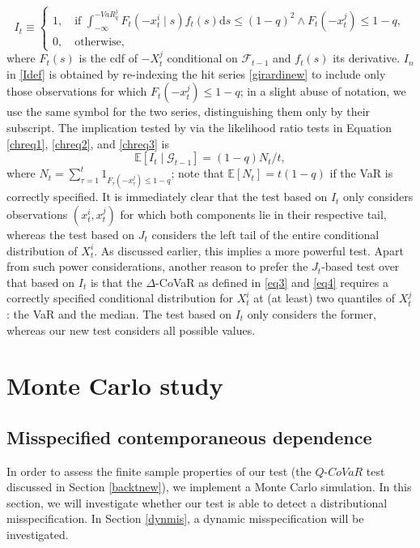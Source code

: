 \documentclass[12pt]{article}
\begin{document}
\begin{equation}\label{girardinew}
I_t\equiv \begin{cases}1,\quad \mbox{if } \int_{-\infty}^{-VaR^j_q}F_t (-x^{i}_t\mid s)f_t(s)\mathrm{d}s\leq (1-q)^2 \wedge F_t (-x^{j}_t) \leq 1-q,\\0,\quad \mbox{otherwise,}\end{cases}
\end{equation}
where $F_t (s)$ is the cdf of $-X_t^j$ conditional on $\mathcal{F}_{t-1}$ and $f_t(s)$ its derivative. $I_n$ in \eqref{Idef} is obtained by re-indexing the hit series \eqref{girardinew} to include only those observations for which $ F_t (-x^{j}_t) \leq 1-q$; in a slight abuse of notation, we use the same symbol for the two series, distinguishing them only by their subscript.  The implication tested by \citet{girardi} via the likelihood ratio tests in Equation \ref{chreq1}, \ref{chreq2}, and \ref{chreq3} is
\[
\mathbb{E}[I_t\mid \mathcal{G}_{t-1}]=(1-q)N_t/t,
\]
where $N_t=\sum_{\tau=1}^t 1_{F_\tau (-x^{j}_\tau) \leq 1-q}$; note that $\mathbb{E}[N_t]=t(1-q)$ if the VaR is correctly specified.
It is immediately clear that the test based on $I_t$ only considers observations $(x_t^i, x_t^j)$ for which both components lie in their respective tail, whereas the test based on $J_t$ considers the  left tail of the entire conditional distribution of $X^i_t$. As discussed earlier, this implies a more powerful test. Apart from such power considerations, another reason to prefer the $J_t$-based test over that based on $I_t$ is that the $\Delta$-CoVaR as defined in \eqref{eq3} and \eqref{eq4} requires a correctly specified conditional distribution for $X_t^i$ at (at least) two quantiles of $X_t^j$: the VaR and the median. The test based on $I_t$ only considers the former, whereas our new test considers all possible values.

\section{Monte Carlo study}

\subsection{Misspecified contemporaneous dependence} \label{dismisspc}

In order to assess the finite sample properties of our test (the $Q$-$CoVaR$ test discussed in Section \ref{backtnew}), we implement a Monte Carlo simulation. In this section, we will investigate whether  our test is able to detect a distributional misspecification. In Section \ref{dynmis}, a dynamic misspecification will be investigated.
\end{document}
